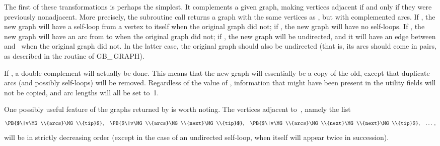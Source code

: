The first of these transformations is perhaps the simplest. It
complements a given graph, making vertices adjacent if and only if
they were previously nonadjacent. More precisely, the subroutine call
 returns a graph with
the
same vertices as , but with complemented arcs.
If , the new graph will have a self-loop from a vertex %
 to itself
when the original graph did not; if , the new graph will
have no self-loops. If , the new graph will have
an arc from  to  when the original graph did not; if ,
the new graph will be undirected, and it will have an edge between 
and~ when the original graph did not. In the latter case, the original
graph should also be undirected (that is, its arcs should come in pairs,
as described in the  routine of {\sc GB\_\,GRAPH}).

If , a double complement will actually be done. This
means that
the new graph will essentially be a copy of the old, except that
duplicate arcs (and possibly self-loops) will be removed. Regardless of
the value of , information that might have been present in the
utility
fields will not be copied, and arc lengths will all be set to~1.

One possibly useful feature of the graphs returned by  is
worth noting. The vertices adjacent to~, namely the list
$$\hbox{\PB{$\|v\MG\\{arcs}\MG\\{tip}$},\quad \PB{$\|v\MG\\{arcs}\MG\\{next}\MG%
\\{tip}$},\quad
\PB{$\|v\MG\\{arcs}\MG\\{next}\MG\\{next}\MG\\{tip}$},\quad \dots\thinspace,}$$
will be in strictly decreasing order (except in the case of an
undirected self-loop, when  itself will appear twice in succession).

